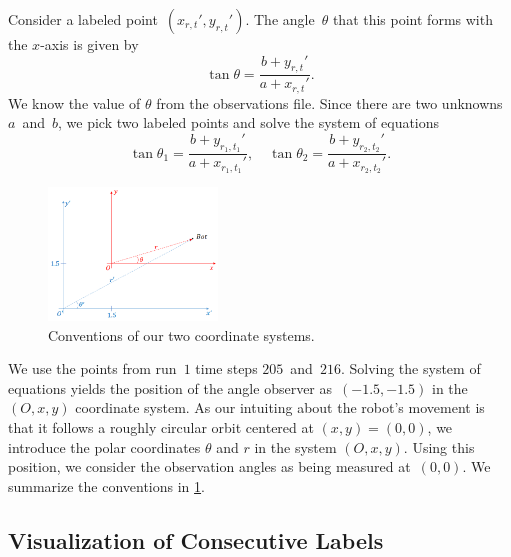 \documentclass[twoside]{article}
\begin{document}
Consider a labeled point~${(x_{r, t}', y_{r, t}')}$.
The angle~$\theta$ that this point forms with the $x$-axis is given by
\begin{equation*}
  \tan\theta = \frac{b + y_{r, t}'}{a + x_{r, t}'}.
\end{equation*}
We know the value of $\theta$ from the observations file.
Since there are two unknowns $a$~and~$b$, we pick two labeled points and solve the system of equations
\begin{equation*}
  \tan\theta_1 = \frac{b + y_{r_1, t_1}'}{a + x_{r_1, t_1}'}, \quad \tan\theta_2 = \frac{b + y_{r_2, t_2}'}{a + x_{r_2, t_2}'}.
\end{equation*}
\begin{figure}[h]
  \centering
  \includegraphics[width=0.40\textwidth]{images/AK2}
  \caption{Conventions of our two coordinate systems.}\label{fig:conventions}
\end{figure}
We use the points from run~$1$ time steps $205$~and~$216$.
Solving the system of equations yields the position of the angle observer as~$(-1.5, -1.5)$ in the ${(O, x, y)}$ coordinate system.
As our intuiting about the robot's movement is that it follows a roughly circular orbit centered at ${(x, y) = (0, 0)}$, we introduce the polar coordinates $\theta$ and $r$ in the system ${(O, x, y)}$.
Using this position, we consider the observation angles as being measured at~$(0, 0)$.
We summarize the conventions in \cref{fig:conventions}.

\subsection{Visualization of Consecutive Labels}\label{sec:visu-cons-labels}
\end{document}
